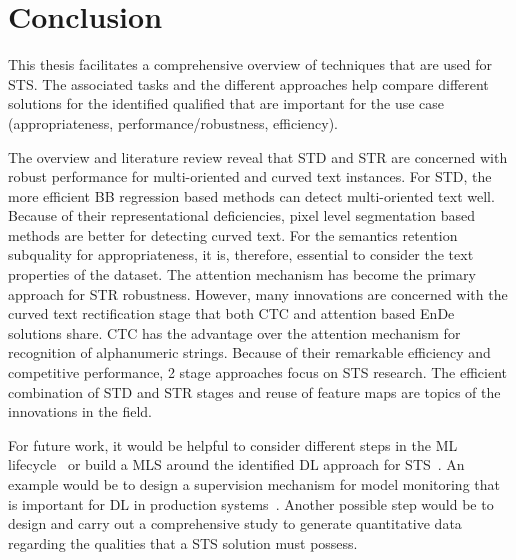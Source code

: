\chapter{Conclusion}
This thesis facilitates a comprehensive overview of techniques that are used for \ac{STS}.
The associated tasks and the different approaches help compare different
solutions for the identified qualified that are important for the use case
(appropriateness, performance/robustness, efficiency).

The overview and literature review reveal that \ac{STD} and \ac{STR} are concerned
with robust performance for multi-oriented and curved text instances.
For \ac{STD}, the more efficient \ac{BB} regression based methods can detect multi-oriented text well.
Because of their representational deficiencies, pixel level segmentation based methods are better for
detecting curved text.
For the semantics retention subquality for appropriateness, it is, therefore, essential to consider
the text properties of the dataset.
The attention mechanism has become the primary approach for \ac{STR} robustness.
However, many innovations are concerned with the curved text rectification stage that both
\ac{CTC} and attention based \ac{EnDe} solutions share.
\ac{CTC} has the advantage over the attention mechanism for recognition of alphanumeric strings.
Because of their remarkable efficiency and competitive performance, 2 stage approaches focus
on \ac{STS} research.
The efficient combination of \ac{STD} and \ac{STR} stages and reuse of feature maps are topics
of the innovations in the field.

For future work, it would be helpful to consider different steps in the \ac{ML}
lifecycle~\citep{watanabe_preliminary_2019} or build a \ac{MLS} around the identified \ac{DL}
approach for \ac{STS}~\citep{siebert_construction_2021,nakamichi_requirements-driven_2020}.
An example would be to design a supervision mechanism for model monitoring that is important for
\ac{DL} in production systems~\cite{nakamichi_requirements-driven_2020,watanabe_preliminary_2019}.
Another possible step would be to design and carry out a comprehensive study to generate quantitative
data regarding the qualities that a \ac{STS} solution must possess.
